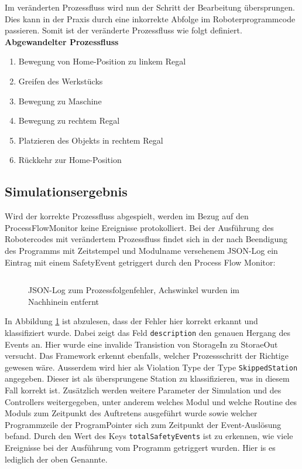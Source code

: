 Im veränderten Prozessfluss wird nun der Schritt der Bearbeitung übersprungen.
Dies kann in der Praxis durch eine inkorrekte Abfolge im Roboterprogrammcode
passieren. Somit ist der veränderte Prozessfluss wie folgt definiert.\\

\noindent
\textbf{Abgewandelter Prozessfluss}
\begin{enumerate}
	\item Bewegung von Home-Position zu linkem Regal
	\item Greifen des Werkstücks
	\item Bewegung zu Maschine
	\item Bewegung zu rechtem Regal
	\item Platzieren des Objekts in rechtem Regal
	\item Rückkehr zur Home-Position
\end{enumerate}

\subsection{Simulationsergebnis}
Wird der korrekte Prozessfluss abgespielt, werden im Bezug auf den
ProcessFlowMonitor keine Ereignisse protokolliert.
Bei der Ausführung des Robotercodes mit verändertem Prozessfluss findet sich in
der nach Beendigung des Programms mit Zeitstempel und Modulname versehenem
JSON-Log ein Eintrag mit einem SafetyEvent getriggert durch den
Process Flow Monitor:
\begin{figure}[H]
	\inputminted[fontsize=\footnotesize]{json}{code-snippets/processflowerror.json}
	\caption{JSON-Log zum Prozessfolgenfehler, Achswinkel wurden im Nachhinein
		entfernt}
	\label{listing:processflowerror}
\end{figure}

\noindent In Abbildung \ref{listing:processflowerror} ist abzulesen, dass der
Fehler hier korrekt erkannt und klassifiziert wurde. Dabei zeigt das Feld
\texttt{description} den genauen Hergang des Events an. Hier wurde eine invalide
Transistion von StorageIn zu StoraeOut versucht. Das Framework erkennt
ebenfalls, welcher Prozessschritt der Richtige gewesen wäre. Ausserdem wird hier
als Violation Type der Type \texttt{SkippedStation} angegeben. Dieser ist als
übersprungene Station zu klassifizieren, was in diesem Fall korrekt ist.
Zusätzlich werden weitere Parameter der Simulation und des Controllers
weitergegeben, unter anderem welches Modul und welche Routine des Moduls zum
Zeitpunkt des Auftretens ausgeführt wurde sowie welcher Programmzeile der
ProgramPointer sich zum Zeitpunkt der Event-Auslösung befand. Durch den Wert des
Keys \texttt{totalSafetyEvents} ist zu erkennen, wie viele Ereignisse bei der
Ausführung vom Programm getriggert wurden. Hier is es lediglich der oben
Genannte.

